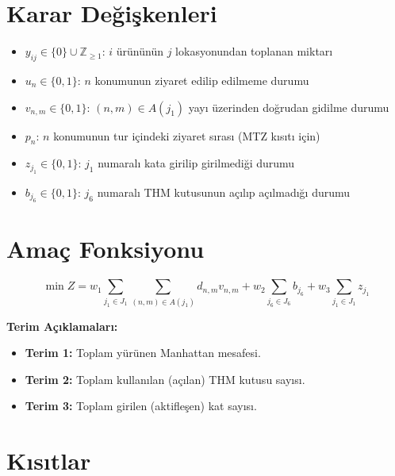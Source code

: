\documentclass[11pt, a4paper]{article}
\begin{document}
\section{Karar Değişkenleri}

\begin{itemize}
    \item $y_{ij} \in \{0\} \cup \mathbb{Z}_{\geq 1}$: $i$ ürününün $j$ lokasyonundan toplanan miktarı
    \item $u_n \in \{0, 1\}$: $n$ konumunun ziyaret edilip edilmeme durumu
    \item $v_{n,m} \in \{0, 1\}$: $(n,m) \in A(j_1)$ yayı üzerinden doğrudan gidilme durumu
    \item $p_n$: $n$ konumunun tur içindeki ziyaret sırası (MTZ kısıtı için)
    \item $z_{j_1} \in \{0, 1\}$: $j_1$ numaralı kata girilip girilmediği durumu
    \item $b_{j_6} \in \{0, 1\}$: $j_6$ numaralı THM kutusunun açılıp açılmadığı durumu
\end{itemize}

\section{Amaç Fonksiyonu}

\begin{equation}
    \min Z = w_1 \sum_{j_1 \in J_1} \sum_{(n,m) \in A(j_1)} d_{n,m} v_{n,m}
    + w_2 \sum_{j_6 \in J_6} b_{j_6}
    + w_3 \sum_{j_1 \in J_1} z_{j_1}
\end{equation}

\noindent \textbf{Terim Açıklamaları:}
\begin{itemize}
    \item \textbf{Terim 1:} Toplam yürünen Manhattan mesafesi.
    \item \textbf{Terim 2:} Toplam kullanılan (açılan) THM kutusu sayısı.
    \item \textbf{Terim 3:} Toplam girilen (aktifleşen) kat sayısı.
\end{itemize}

\section{Kısıtlar}
\end{document}
